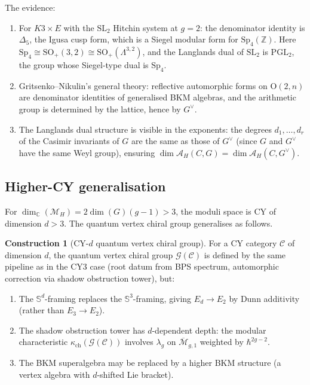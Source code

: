 \documentclass[11pt]{article}
\theoremstyle{definition}
\newtheorem{construction}[theorem]{Construction}
\theoremstyle{remark}
\newcommand{\cA}{\mathcal{A}}
\newcommand{\cC}{\mathcal{C}}
\newcommand{\cM}{\mathcal{M}}
\begin{document}
The evidence:
\begin{enumerate}[label=(\alph*)]
 \item For $K3 \times E$ with the $\mathrm{SL}_2$ Hitchin system at $g = 2$: the denominator identity is $\Delta_5$, the Igusa cusp form, which is a Siegel modular form for $\mathrm{Sp}_4(\mathbb{Z})$. Here $\mathrm{Sp}_4 \cong \mathrm{SO}_+(3,2) \cong \mathrm{SO}_+(\Lambda^{3,2})$, and the Langlands dual of $\mathrm{SL}_2$ is $\mathrm{PGL}_2$, the group whose Siegel-type dual is $\mathrm{Sp}_4$.
 \item Gritsenko--Nikulin's general theory: reflective automorphic forms on $\mathrm{O}(2, n)$ are denominator identities of generalised BKM algebras, and the arithmetic group is determined by the lattice, hence by $G^\vee$.
 \item The Langlands dual structure is visible in the exponents: the degrees $d_1, \ldots, d_r$ of the Casimir invariants of $G$ are the same as those of $G^\vee$ (since $G$ and $G^\vee$ have the same Weyl group), ensuring $\dim \cA_H(C, G) = \dim \cA_H(C, G^\vee)$.
\end{enumerate}


\subsection{Higher-CY generalisation}
\label{sec:higher-cy-generalisation}

For $\dim_\mathbb{C}(\cM_H) = 2\dim(G)(g-1) > 3$, the moduli space is CY of dimension $d > 3$. The quantum vertex chiral group generalises as follows.

\begin{construction}[CY-$d$ quantum vertex chiral group]
\label{constr:cyd-qvcg}
For a CY category $\cC$ of dimension $d$, the quantum vertex chiral group $\mathcal{G}(\cC)$ is defined by the same pipeline as in the CY3 case (root datum from BPS spectrum, automorphic correction via shadow obstruction tower), but:
\begin{enumerate}[label=(\roman*)]
 \item The $\mathbb{S}^d$-framing replaces the $\mathbb{S}^3$-framing, giving $E_d \to E_2$ by Dunn additivity (rather than $E_3 \to E_2$).
 \item The shadow obstruction tower has $d$-dependent depth: the modular characteristic $\kappa_{\mathrm{ch}}(\mathcal{G}(\cC))$ involves $\lambda_g$ on $\overline{\cM}_{g,1}$ weighted by $\hbar^{2g-2}$.
 \item The BKM superalgebra may be replaced by a higher BKM structure (a vertex algebra with $d$-shifted Lie bracket).
\end{enumerate}
\end{construction}
\end{document}
